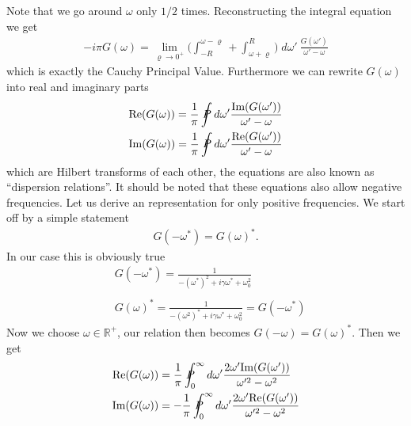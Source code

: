 \documentclass[a4paper]{article}
\begin{document}
Note that we go around $\omega$ only $1/2$ times. Reconstructing the integral
equation we get
\begin{align}
    -i\pi G(\omega) = \lim_{\varrho \rightarrow 0^+}
    \big(
     \int_{-R}^{\omega -\varrho} + \int_{\omega +\varrho}^R
    \big) \;d\omega'\ \frac{G(\omega')}{\omega' - \omega}
\end{align}
which is exactly the Cauchy Principal Value. Furthermore we can rewrite
$G(\omega)$ into real and imaginary parts
\begin{align}
    \text{Re} (G(\omega)) = \frac{1}{\pi} \PV  d\omega' \frac{\text{Im}
    (G(\omega'))}{\omega' - \omega}\\
    \text{Im} (G(\omega)) = \frac{1}{\pi} \PV  d\omega' \frac{\text{Re}
    (G(\omega'))}{\omega' - \omega}\\
\end{align}
which are Hilbert transforms of each other, the equations are also known
as ``dispersion relations''. It should be noted that these equations also allow
negative frequencies. Let us derive an representation for only positive
frequencies. We start off by a simple statement
\begin{align}
    G(-\omega^*) = G(\omega)^*.
\end{align}
In our case this is obviously true
\begin{align}
    &G(-\omega^*) = \frac{1}{-(\omega^*)^2 + i\gamma \omega^* + \omega_0^2}\\
    \nonumber \\
    &G(\omega)^* = \frac{1}{-(\omega^2)^* + i\gamma \omega^* + \omega_0^2} =
    G(-\omega^*)
\end{align}
Now we choose $\omega \in \mathbb{R}^+$, our relation then becomes
$G(-\omega) = G(\omega)^*$. Then we get
\begin{align}
    \text{Re} (G(\omega)) &= \frac{1}{\pi} \PV_0^\infty  d\omega' \frac{2\omega'\text{Im}
    (G(\omega'))}{\omega'^2 - \omega^2}\\
    \text{Im} (G(\omega)) &= -\frac{1}{\pi} \PV_0^\infty  d\omega' \frac{2\omega'\text{Re}
    (G(\omega'))}{\omega'^2 - \omega^2}
\end{align}
\end{document}
